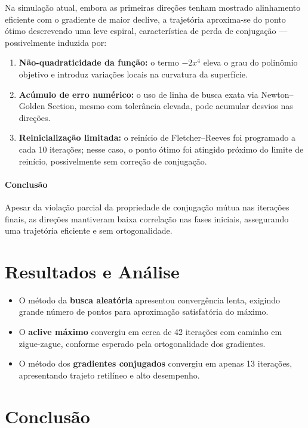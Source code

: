 \documentclass[12pt]{article}
\begin{document}
Na simulação atual, embora as primeiras direções tenham mostrado alinhamento eficiente com o gradiente de maior declive, a trajetória aproxima-se do ponto ótimo descrevendo uma leve espiral, característica de perda de conjugação — possivelmente induzida por:

\begin{enumerate}
  \item \textbf{Não-quadraticidade da função:} o termo $-2x^4$ eleva o grau do polinômio objetivo e introduz variações locais na curvatura da superfície.
  \item \textbf{Acúmulo de erro numérico:} o uso de linha de busca exata via Newton–Golden Section, mesmo com tolerância elevada, pode acumular desvios nas direções.
  \item \textbf{Reinicialização limitada:} o reinício de Fletcher–Reeves foi programado a cada 10 iterações; nesse caso, o ponto ótimo foi atingido próximo do limite de reinício, possivelmente sem correção de conjugação.
\end{enumerate}

\paragraph{Conclusão}

Apesar da violação parcial da propriedade de conjugação mútua nas iterações finais, as direções mantiveram baixa correlação nas fases iniciais, assegurando uma trajetória eficiente e sem ortogonalidade.
\section*{Resultados e Análise}

\begin{itemize}
    \item O método da \textbf{busca aleatória} apresentou convergência lenta, exigindo grande número de pontos para aproximação satisfatória do máximo.
    \item O \textbf{aclive máximo} convergiu em cerca de 42 iterações com caminho em zigue-zague, conforme esperado pela ortogonalidade dos gradientes.
    \item O método dos \textbf{gradientes conjugados} convergiu em apenas 13 iterações, apresentando trajeto retilíneo e alto desempenho.
\end{itemize}

\section*{Conclusão}
\end{document}
